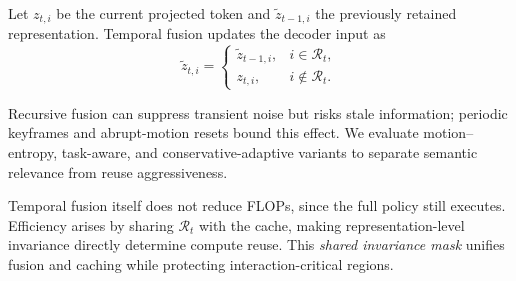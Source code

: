 Let $z_{t,i}$ be the current projected token and
$\widetilde z_{t-1,i}$ the previously retained representation. Temporal fusion
updates the decoder input as
\begin{equation}
    \widetilde z_{t,i}=
    \begin{cases}
      \widetilde z_{t-1,i},&i\in\mathcal R_t,\\
      z_{t,i},&i\notin\mathcal R_t.
    \end{cases}
    \label{eq:temporal_fusion}
\end{equation}

Recursive fusion can suppress transient noise but risks stale information; periodic keyframes and abrupt-motion resets bound this effect. We evaluate motion--entropy, task-aware, and conservative-adaptive variants to separate semantic relevance from reuse aggressiveness.

Temporal fusion itself does not reduce FLOPs, since the full policy still executes. Efficiency arises by sharing $\mathcal R_t$ with the cache, making representation-level invariance directly determine compute reuse. This \emph{shared invariance mask} unifies fusion and caching while protecting interaction-critical regions.

